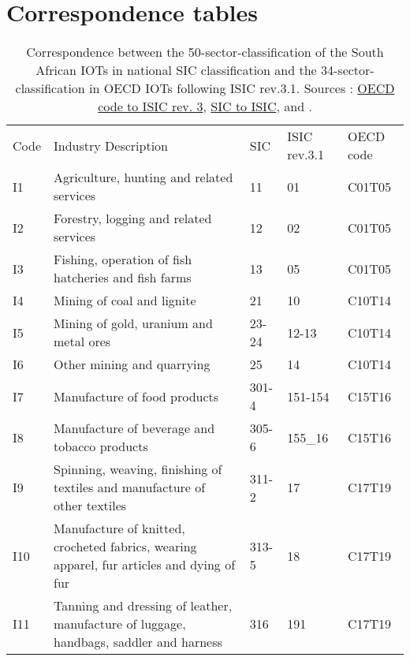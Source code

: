 \documentclass[12pt,english]{article}
\begin{document}
\section{Correspondence tables}

\clearpage
\begin{table}[ht]
	\centering
	\vspace{-36pt}\hspace{-10pt}\caption{\label{correspondance_OECD_ZA}Correspondence between the 50-sector-classification of the South African IOTs in national SIC classification and the 34-sector-classification in OECD IOTs following ISIC rev.3.1. Sources : \href{http://www.oecd.org/sti/ind/IOT_Industries_Items.pdf}{OECD code to ISIC rev. 3}, \href{https://www.statssa.gov.za/additional_services/sic/descrip6.htm}{SIC to ISIC}, \cite{IOT2014} and .}
	\vspace{8pt}%
	\begin{adjustbox}{width=\textwidth}
	\normalsize
		\begin{tabular}{lp{500pt}lll}
		\toprule
		Code & Industry Description & SIC & ISIC rev.3.1 & OECD code \\ \arrayrulecolor{black!30}\midrule
		I1 & Agriculture, hunting and related services & 11 & 01 & C01T05 \\ \midrule
		I2 & Forestry, logging and related services & 12 & 02 & C01T05 \\ \midrule
		I3 & Fishing, operation of fish hatcheries and fish farms & 13 & 05 & C01T05 \\ \midrule
		I4 & Mining of coal and lignite & 21 & 10 & C10T14 \\ \midrule
		I5 & Mining of gold, uranium and metal ores  & 23-24 & 12-13 & C10T14 \\ \midrule
		I6 & Other mining and quarrying & 25 & 14 & C10T14 \\ \midrule
		I7 & Manufacture of food products & 301-4 & 151-154 & C15T16 \\ \midrule
		I8 & Manufacture of beverage and tobacco products & 305-6 & 155\_16 & C15T16 \\ \midrule
		I9 & Spinning, weaving, finishing of textiles and manufacture of other textiles & 311-2 & 17 & C17T19 \\ \midrule
		I10 & Manufacture of knitted, crocheted fabrics, wearing apparel, fur articles and dying of fur & 313-5 & 18 & C17T19 \\ \midrule
		I11 & Tanning and dressing of leather, manufacture of luggage, handbags, saddler and harness & 316 & 191 & C17T19 \\ \midrule

\end{tabular}
\end{adjustbox}
\end{table}
\end{document}
